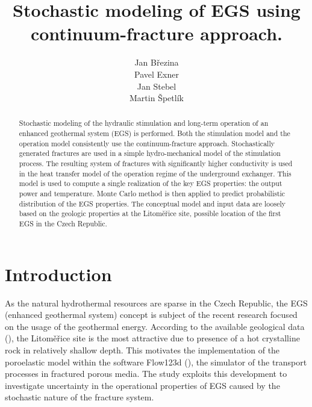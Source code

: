 \documentclass{article}
\title{Stochastic modeling of EGS using continuum-fracture approach.}
\author{
  Jan B{\v r}ezina \\
  \And
  Pavel Exner \\
  \And
  Jan Stebel \\
  \And
  Martin {\v S}petl{\' i}k \\
}
\begin{document}
\maketitle

\begin{abstract}
Stochastic modeling of the hydraulic stimulation and long-term operation of an enhanced geothermal system (EGS) is performed.
Both the stimulation model and the operation model consistently use the continuum-fracture approach. Stochastically generated
fractures are used in a simple hydro-mechanical model of the stimulation process. The resulting system of fractures with significantly
higher conductivity is used in the heat transfer model of the operation regime of the underground exchanger. This model is used to
compute a single realization of the key EGS properties: the output power and temperature. Monte Carlo method is then applied to
predict probabilistic distribution of the EGS properties. The conceptual model and input data are loosely based on the geologic
properties at the Litoměřice site, possible location of the first EGS in the Czech Republic.
\end{abstract}




\section{Introduction}
As the natural hydrothermal resources are sparse in the Czech Republic, the EGS (enhanced geothermal system) concept is subject
of the recent research focused on the usage of the geothermal energy. According to the available geological data (\cite{Capova2013}), the
Litoměřice site is the most attractive due to presence of a hot crystalline rock in relatively shallow depth. This motivates the
implementation of the poroelastic model within the software Flow123d (\cite{flow123d}), the simulator
of the transport processes in fractured porous media. The study exploits this development to investigate uncertainty in the operational
properties of EGS caused by the stochastic nature of the fracture system.
\end{document}
